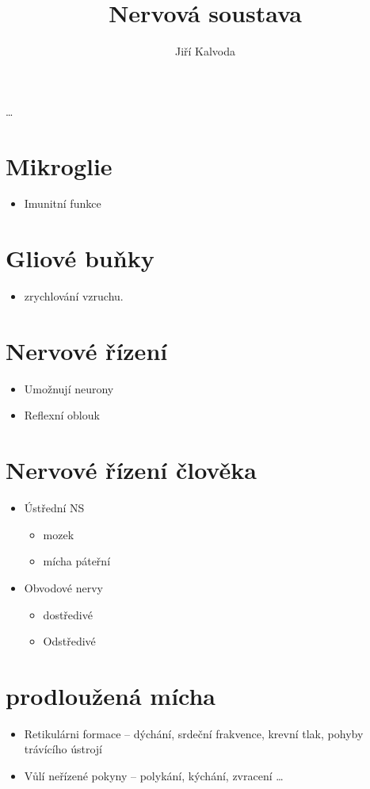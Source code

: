 \documentclass[a4]{article}
\title{Nervová soustava}
\author{Jiří Kalvoda}
\begin{document}
\maketitle
{\huge\dots}
\section{Mikroglie}
\begin{itemize}
	\item Imunitní funkce
\end{itemize}
\section{Gliové buňky}
\begin{itemize}
	\item zrychlování vzruchu.
\end{itemize}
\section{Nervové řízení}
\begin{itemize}
	\item Umožnují neurony
	\item Reflexní oblouk
\end{itemize}
\section{Nervové řízení člověka}
\begin{itemize}
	\item Ústřední NS
\begin{itemize}
	\item mozek
	\item mícha páteřní
\end{itemize}
\item Obvodové nervy
	\begin{itemize}
		\item dostředivé
		\item Odstředivé
	\end{itemize}
\end{itemize}
\section{prodloužená mícha}
\begin{itemize}
	\item Retikulárni formace --  dýchání, srdeční frakvence, krevní tlak, pohyby trávícího ústrojí
	\item Vůlí neřízené pokyny -- polykání, kýchání, zvracení \dots
\end{itemize}
\end{document}
